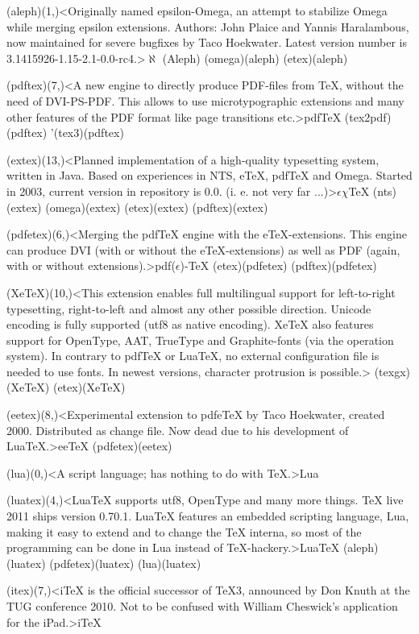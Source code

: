 {	\steplayer[-1]

	\tonode(aleph)(1,\layer)<Originally named epsilon-Omega, an attempt to stabilize Omega while merging epsilon extensions. Authors: John Plaice and Yannis Haralambous, now maintained for severe bugfixes by Taco Hoekwater. Latest version number is 3.1415926-1.15-2.1-0.0-rc4.>{$\aleph$ (Aleph)}
		\todraw(omega)(aleph)
		\todraw(etex)(aleph)
	
	\tonode[\vip](pdftex)(7,\layer)<A new engine to directly produce PDF-files from TeX, without the need of DVI-PS-PDF. This allows to use microtypographic extensions and many other features of the PDF format like page transitions etc.>{pdf\TeX}
		\todraw(tex2pdf)(pdftex)
		\todraw'(tex3)(pdftex)
	
	\steplayer[-1]

	\tonode[\experimental](extex)(13,\layer)<Planned implementation of a high-quality typesetting system, written in Java. Based on experiences in NTS, eTeX, pdfTeX and Omega. Started in 2003, current version in repository is 0.0. (i. e. not very far ...)>{$\epsilon\chi$\TeX}
		\todraw(nts)(extex)
		\todraw(omega)(extex)
		\todraw(etex)(extex)
		\todraw(pdftex)(extex)

	\steplayer[-1]
	
	\tonode[\vip](pdfetex)(6,\layer)<Merging the pdfTeX engine with the eTeX-extensions. This engine can produce DVI (with or without the eTeX-extensions) as well as PDF (again, with or without extensions).>{pdf($\epsilon$)-\TeX}
		\todraw*(etex)(pdfetex)
		\todraw*(pdftex)(pdfetex)

	\tonode[\vip](XeTeX)(10,\layer)<This extension enables full multilingual support for left-to-right typesetting, right-to-left and almost any other possible direction. Unicode encoding is fully supported (utf8 as native encoding). XeTeX also features support for OpenType, AAT, TrueType and Graphite-fonts (via the operation system). In contrary to pdfTeX or LuaTeX, no external configuration file is needed to use fonts. In newest versions, character protrusion is possible.>{\XeTeX}
		\todraw(texgx)(XeTeX)
		\todraw*(etex)(XeTeX)
	
	\steplayer[-2]

	\tonode[\experimental](eetex)(8,\layer)<Experimental extension to pdfeTeX by Taco Hoekwater, created 2000. Distributed as change file. Now dead due to his development of LuaTeX.>{ee\TeX}
		\todraw(pdfetex)(eetex)
	
	\steplayer[-1]

	\tonode[\program](lua)(0,\layer)<A script language; has nothing to do with TeX.>{Lua}
	
	\tonode[\vip](luatex)(4,\layer)<LuaTeX supports utf8, OpenType and many more things. TeX live 2011 ships version 0.70.1. LuaTeX features an embedded scripting language, Lua, making it easy to extend and to change the TeX interna, so most of the programming can be done in Lua instead of TeX-hackery.>{Lua\TeX}
		\todraw(aleph)(luatex)
		\todraw*(pdfetex)(luatex)
		\todraw[dashed](lua)(luatex)
	
	\steplayer[-3]
	\tonode[\experimental](itex)(7,\layer)<iTeX is the official successor of TeX3, announced by Don Knuth at the TUG conference 2010. Not to be confused with William Cheswick's application for the iPad.>{i\TeX}
}
